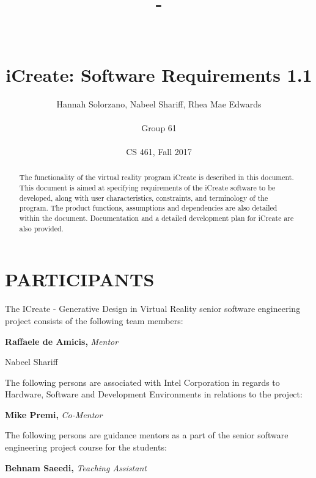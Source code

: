 \documentclass[letterpaper,draftclsnofoot,onecolumn,10 pt,compsoc]{IEEEtran}
\title{-\\ ~ \\ ~ \\iCreate: Software Requirements 1.1}
\author{Hannah Solorzano, Nabeel Shariff, Rhea Mae Edwards \\ ~ \\ Group 61 \\ ~ \\ CS 461, Fall 2017}
\begin{document}
\maketitle

\begin{abstract}
\noindent
The functionality of the virtual reality program iCreate is described in this document. This document is aimed at specifying requirements of the iCreate software to be developed, along with user characteristics, constraints, and terminology of the program. The product functions, assumptions and dependencies are also detailed within the document. Documentation and a detailed development plan for iCreate are also provided.
\end{abstract}

\newpage

\section*{PARTICIPANTS}
The ICreate - Generative Design in Virtual Reality senior software engineering project consists of the following team members:
\bigskip

\noindent\leavevmode\rlap{}\hfill{\textbf{Raffaele de Amicis,} \textit{Mentor}}\hfill\llap{}\par
\noindent\leavevmode{}\hfill{Nabeel Shariff}\hfill{}\par

\bigskip
\noindent
The following persons are associated with Intel Corporation in regards to Hardware, Software and Development Environments in relations to the project:
\bigskip

\noindent\leavevmode\rlap{}\hfill{\textbf{Mike Premi,} \textit{Co-Mentor}}\hfill\llap{}\par

\bigskip
\noindent
The following persons are guidance mentors as a part of the senior software engineering project course for the students:
\bigskip

\noindent\leavevmode{}\hfill{\textbf{Behnam Saeedi,} \textit{Teaching Assistant}}\hfill{}\par
\newpage
\end{document}
